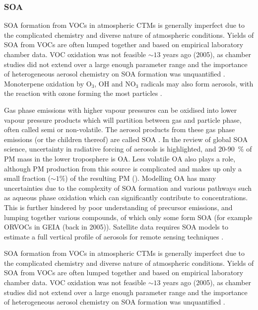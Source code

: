   \subsubsection{SOA}
    \label{LR:VOCs:IsopCascade:SOA}
    
    SOA formation from VOCs in atmospheric CTMs is generally imperfect due to the complicated chemistry and diverse nature of atmospheric conditions.
    Yields of SOA from VOCs are often lumped together and based on empirical laboratory chamber data. 
    VOC oxidation was not feasible $\sim 13$ years ago (2005), as chamber studies did not extend over a large enough parameter range and the importance of heterogeneous aerosol chemistry on SOA formation was unquantified \parencite{Kanakidou2005}.
    Monoterpene oxidation by O$_3$, OH and NO$_3$ radicals may also form aerosols, with the reaction with ozone forming the most particles \parencite{Kanakidou2005}.
    
    Gas phase emissions with higher vapour pressures can be oxidised into lower vapour pressure products which will partition between gas and particle phase, often called semi or non-volatile. 
    The aerosol products from these gas phase emissions (or the children thereof) are called SOA \parencite{Kanakidou2005}.
    In the \cite{Kanakidou2005} review of global SOA science, uncertainty in radiative forcing of aerosols is highlighted, and 20-90~\% of PM mass in the lower troposphere is OA.
    Less volatile OA also plays a role, although PM production from this source is complicated and makes up only a small fraction ($\sim 1 \%$) of the resulting PM (\cite{Kroll2008, Bei2012}).
    Modelling OA has many uncertainties due to the complexity of SOA formation and various pathways such as aqueous phase oxidation which can significantly contribute to concentrations.
    This is further hindered by poor understanding of precursor emissions, and lumping together various compounds, of which only some form SOA (for example ORVOCs in GEIA (back in 2005)).
    Satellite data requires SOA models to estimate a full vertical profile of aerosols for remote sensing techniques \parencite{Kanakidou2005}.
    
    SOA formation from VOCs in atmospheric CTMs is generally imperfect due to the complicated chemistry and diverse nature of atmospheric conditions.
    Yields of SOA from VOCs are often lumped together and based on empirical laboratory chamber data. 
    VOC oxidation was not feasible $\sim 13$ years ago (2005), as chamber studies did not extend over a large enough parameter range and the importance of heterogeneous aerosol chemistry on SOA formation was unquantified \parencite{Kanakidou2005}.
    
